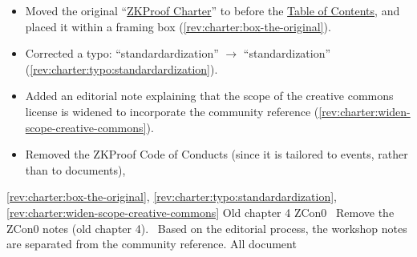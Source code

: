 				\begin{itemize}
				\item Moved the original ``\hyperref[sec:prelim:charter]{ZKProof Charter}'' to before the \hyperref[prelim:contents]{Table of Contents}, and placed it within a framing box (\ref{rev:charter:box-the-original}).
				\item Corrected a typo: ``standardardization'' $\rightarrow$ ``standardization'' (\ref{rev:charter:typo:standardardization}).
				\item Added an editorial note explaining that the scope of the creative commons license is widened to incorporate the community reference (\ref{rev:charter:widen-scope-creative-commons}).
				\item Removed the ZKProof Code of Conducts (since it is tailored to events, rather than to documents), 
				\end{itemize}
\newcol \ref{rev:charter:box-the-original}, \ref{rev:charter:typo:standardardization}, \ref{rev:charter:widen-scope-creative-commons}
\rowendL
Old chapter 4 ZCon0
\newcol 
\newcol {}
\newcol \Chan\ Remove the ZCon0 notes (old chapter 4). \Note\ Based on the editorial process, 
				the workshop notes are separated from the community reference.
\newcol 
\rowendL
All document
\newcol 
\newcol {}
\newcol \Chan\ 
\newcol 
\rowendL
\myendIssue
